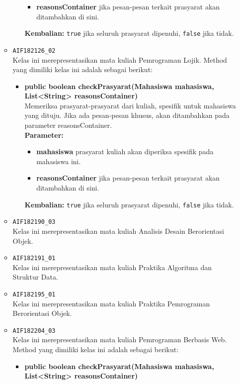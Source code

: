 \begin{enumerate}
\begin{itemize}
\begin{itemize}
\begin{itemize}
				\item \textbf{reasonsContainer} jika pesan-pesan terkait prasyarat akan ditambahkan di sini.
			\end{itemize}
			\textbf{Kembalian:} \texttt{true} jika seluruh prasyarat dipenuhi, \texttt{false} jika tidak.
		\end{itemize}
		\item \texttt{AIF182126\_02} \\
		Kelas ini merepresentasikan mata kuliah Pemrograman Lojik. Method yang dimiliki kelas ini adalah sebagai berikut: 
		\begin{itemize}
			\item \textbf{public boolean checkPrasyarat(Mahasiswa mahasiswa, List<String> reasonsContainer)}\\
			Memeriksa prasyarat-prasyarat dari kuliah, spesifik untuk mahasiswa yang dituju. Jika ada pesan-pesan khusus, akan ditambahkan pada parameter reasonsContainer.\\
			\textbf{Parameter:}
			\begin{itemize}
				\item \textbf{mahasiswa} prasyarat kuliah akan diperiksa spesifik pada mahasiswa ini.
				\item \textbf{reasonsContainer} jika pesan-pesan terkait prasyarat akan ditambahkan di sini.
			\end{itemize}
			\textbf{Kembalian:} \texttt{true} jika seluruh prasyarat dipenuhi, \texttt{false} jika tidak.
		\end{itemize}
		\item \texttt{AIF182190\_03} \\
		Kelas ini merepresentasikan mata kuliah Analisis Desain Berorientasi  Objek.
		\item \texttt{AIF182191\_01} \\
		Kelas ini merepresentasikan mata kuliah Praktika Algoritma dan Struktur Data.
		\item \texttt{AIF182195\_01} \\
		Kelas ini merepresentasikan mata kuliah Praktika Pemrograman Berorientasi Objek.
		\item \texttt{AIF182204\_03} \\
		Kelas ini merepresentasikan mata kuliah Pemrograman Berbasis Web. Method yang dimiliki kelas ini adalah sebagai berikut: 
		\begin{itemize}
			\item \textbf{public boolean checkPrasyarat(Mahasiswa mahasiswa, List<String> reasonsContainer)}\\

\end{itemize}
\end{itemize}
\end{enumerate}
